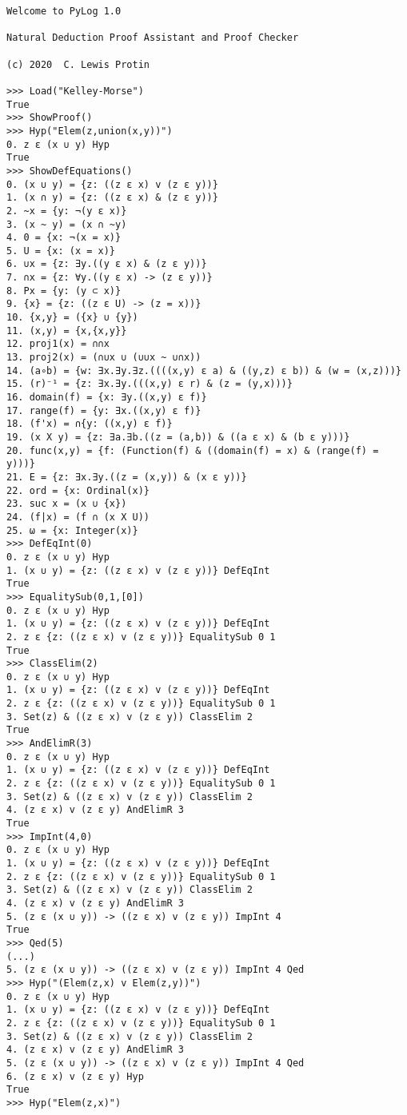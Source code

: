 \documentclass[12pt,leqno]{article}
\numberwithin{equation}{section}
\begin{document}
\begin{verbatim}
Welcome to PyLog 1.0

Natural Deduction Proof Assistant and Proof Checker

(c) 2020  C. Lewis Protin

>>> Load("Kelley-Morse")
True
>>> ShowProof()
>>> Hyp("Elem(z,union(x,y))")
0. z ε (x ∪ y) Hyp 
True
>>> ShowDefEquations()
0. (x ∪ y) = {z: ((z ε x) v (z ε y))} 
1. (x ∩ y) = {z: ((z ε x) & (z ε y))} 
2. ~x = {y: ¬(y ε x)} 
3. (x ~ y) = (x ∩ ~y) 
4. 0 = {x: ¬(x = x)} 
5. U = {x: (x = x)} 
6. ∪x = {z: ∃y.((y ε x) & (z ε y))} 
7. ∩x = {z: ∀y.((y ε x) -> (z ε y))} 
8. Px = {y: (y ⊂ x)} 
9. {x} = {z: ((z ε U) -> (z = x))} 
10. {x,y} = ({x} ∪ {y}) 
11. (x,y) = {x,{x,y}} 
12. proj1(x) = ∩∩x 
13. proj2(x) = (∩∪x ∪ (∪∪x ~ ∪∩x)) 
14. (a∘b) = {w: ∃x.∃y.∃z.((((x,y) ε a) & ((y,z) ε b)) & (w = (x,z)))} 
15. (r)⁻¹ = {z: ∃x.∃y.(((x,y) ε r) & (z = (y,x)))} 
16. domain(f) = {x: ∃y.((x,y) ε f)} 
17. range(f) = {y: ∃x.((x,y) ε f)} 
18. (f'x) = ∩{y: ((x,y) ε f)} 
19. (x X y) = {z: ∃a.∃b.((z = (a,b)) & ((a ε x) & (b ε y)))} 
20. func(x,y) = {f: (Function(f) & ((domain(f) = x) & (range(f) = y)))} 
21. E = {z: ∃x.∃y.((z = (x,y)) & (x ε y))} 
22. ord = {x: Ordinal(x)} 
23. suc x = (x ∪ {x}) 
24. (f|x) = (f ∩ (x X U)) 
25. ω = {x: Integer(x)} 
>>> DefEqInt(0)
0. z ε (x ∪ y) Hyp 
1. (x ∪ y) = {z: ((z ε x) v (z ε y))} DefEqInt 
True
>>> EqualitySub(0,1,[0])
0. z ε (x ∪ y) Hyp 
1. (x ∪ y) = {z: ((z ε x) v (z ε y))} DefEqInt 
2. z ε {z: ((z ε x) v (z ε y))} EqualitySub 0 1
True
>>> ClassElim(2)
0. z ε (x ∪ y) Hyp 
1. (x ∪ y) = {z: ((z ε x) v (z ε y))} DefEqInt 
2. z ε {z: ((z ε x) v (z ε y))} EqualitySub 0 1
3. Set(z) & ((z ε x) v (z ε y)) ClassElim 2
True
>>> AndElimR(3)
0. z ε (x ∪ y) Hyp 
1. (x ∪ y) = {z: ((z ε x) v (z ε y))} DefEqInt 
2. z ε {z: ((z ε x) v (z ε y))} EqualitySub 0 1
3. Set(z) & ((z ε x) v (z ε y)) ClassElim 2
4. (z ε x) v (z ε y) AndElimR 3
True
>>> ImpInt(4,0)
0. z ε (x ∪ y) Hyp 
1. (x ∪ y) = {z: ((z ε x) v (z ε y))} DefEqInt 
2. z ε {z: ((z ε x) v (z ε y))} EqualitySub 0 1
3. Set(z) & ((z ε x) v (z ε y)) ClassElim 2
4. (z ε x) v (z ε y) AndElimR 3
5. (z ε (x ∪ y)) -> ((z ε x) v (z ε y)) ImpInt 4
True
>>> Qed(5)
(...)
5. (z ε (x ∪ y)) -> ((z ε x) v (z ε y)) ImpInt 4 Qed
>>> Hyp("(Elem(z,x) v Elem(z,y))")
0. z ε (x ∪ y) Hyp 
1. (x ∪ y) = {z: ((z ε x) v (z ε y))} DefEqInt 
2. z ε {z: ((z ε x) v (z ε y))} EqualitySub 0 1
3. Set(z) & ((z ε x) v (z ε y)) ClassElim 2
4. (z ε x) v (z ε y) AndElimR 3
5. (z ε (x ∪ y)) -> ((z ε x) v (z ε y)) ImpInt 4 Qed
6. (z ε x) v (z ε y) Hyp 
True
>>> Hyp("Elem(z,x)")

\end{verbatim}
\end{document}
